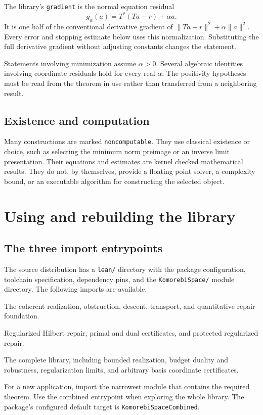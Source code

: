 \documentclass[11pt]{article}
\newcommand{\leanname}[1]{{\small\ttfamily\nolinkurl{#1}}}
\newcommand{\guidechapter}[1]{\par\Needspace{8\baselineskip}\section{#1}}
\begin{document}
The library's \leanname{gradient} is the normal equation residual
\[
 g_\alpha(a)=T^*(Ta-r)+\alpha a.
\]
It is one half of the conventional derivative gradient of $\|Ta-r\|^2+\alpha\|a\|^2$. Every error and stopping estimate below uses this normalization. Substituting the full derivative gradient without adjusting constants changes the statement.

Statements involving minimization assume $\alpha>0$. Several algebraic identities involving coordinate residuals hold for every real $\alpha$. The positivity hypotheses must be read from the theorem in use rather than transferred from a neighboring result.

\subsection{Existence and computation}
Many constructions are marked \leanname{noncomputable}. They use classical existence or choice, such as selecting the minimum norm preimage or an inverse limit presentation. Their equations and estimates are kernel checked mathematical results. They do not, by themselves, provide a floating point solver, a complexity bound, or an executable algorithm for constructing the selected object.

\guidechapter{Using and rebuilding the library}
\subsection{The three import entrypoints}
The source distribution has a \leanname{lean/} directory with the package configuration, toolchain specification, dependency pins, and the \leanname{KomorebiSpace/} module directory. The following imports are available.
\begin{description}[style=nextline]
\item[\leanname{KomorebiSpace}] The coherent realization, obstruction, descent, transport, and quantitative repair foundation.
\item[\leanname{KomorebiSpaceRegularization}] Regularized Hilbert repair, primal and dual certificates, and protected regularized repair.
\item[\leanname{KomorebiSpaceCombined}] The complete library, including bounded realization, budget duality and robustness, regularization limits, and arbitrary basis coordinate certificates.
\end{description}
For a new application, import the narrowest module that contains the required theorem. Use the combined entrypoint when exploring the whole library. The package's configured default target is \leanname{KomorebiSpaceCombined}.
\end{document}
